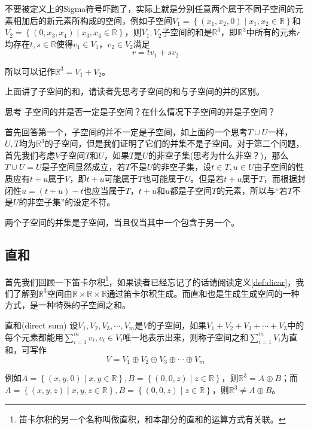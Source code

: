 不要被定义上的Sigma符号吓跑了，实际上就是分别任意两个属于不同子空间的元素相加后的新元素所构成的空间，例如子空间$V_1=\left\{ (x_1,x_2,0)\mid x_1,x_2\in \mathbb{R} \right\}$和$V_2=\left\{ (0,x_3,x_4)\mid x_3,x_4\in \mathbb{R} \right\}$，则$V_1,V_2$子空间的和是$\mathbb{R}^3$，即$\mathbb{R}^3$中所有的元素$r$均存在$t,s\in \mathbb{R}$使得$v_1\in V_1$，$v_2\in V_2$满足$$r=tv_1+sv_2$$

所以可以记作$\mathbb{R}^3=V_1+V_2$。

上面讲了子空间的和，请读者先思考子空间的和与子空间的并的区别。

\begin{ascolorbox1}{思考}
	子空间的并是否一定是子空间？在什么情况下子空间的并是子空间？
\end{ascolorbox1}

首先回答第一个，子空间的并不一定是子空间，如上面的一个思考$T\cup U$一样，$U,T$均为$\mathbb{R}^3$的子空间，但是我们证明了它们的并集不是子空间。对于第二个问题，首先我们考虑$V$子空间$T$和$U$，如果$T$是$U$的非空子集(思考为什么非空？)，那么$T \cup U=U$是子空间显然成立，若$T$不是$U$的非空子集，设$t\in T,u\in U$由子空间的性质应有$t+u$属于$V$，即$t+u$可能属于$T$也可能属于$U$。但是若$t+u$属于$T$，而根据封闭性$u=(t+u)-t$也应当属于$T$，$t+u$和$u$都是子空间$T$的元素，所以与``若$T$不是$U$的非空子集''的设定不符。

\begin{corollary}
	两个子空间的并集是子空间，当且仅当其中一个包含于另一个。
\end{corollary}

\subsection{直和}

首先我们回顾一下笛卡尔积\footnote{笛卡尔积的另一个名称叫做直积，和本部分的直和的运算方式有关联。}，如果读者已经忘记了的话请阅读定义\ref{def:dicar}，我们了解到$\mathbb{R}^3$空间由$\mathbb{R}\times\mathbb{R}\times\mathbb{R}$通过笛卡尔积生成。而直和也是生成生成空间的一种方式，是一种特殊的子空间之和。

\begin{definition}{直和(direct sum)}
	设$V_1,V_2,V_3,\cdots,V_m$是$V$的子空间，如果$V_1+V_2+V_3+\cdots+V_3$中的每个元素都能用$\sum_{i=1}^{m}v_i ,v_i\in V_i$唯一地表示出来，则称子空间之和$\sum_{i=1}^{m}V_i $为直和，可写作$$V=V_1\oplus V_2\oplus V_3\oplus \cdots \oplus V_m$$
\end{definition}

例如$A=\left\{ (x,y,0)\mid x,y \in \mathbb{R} \right\},B=\left\{ (0,0,z)\mid z\in \mathbb{R} \right\}$，则$\mathbb{R}^3=A \oplus B$；而$A=\left\{ (x,y,z)\mid x,y,z \in \mathbb{R} \right\},B=\left\{ (0,0,z)\mid z\in \mathbb{R} \right\}$，则$\mathbb{R}^3\neq A \oplus B$。

